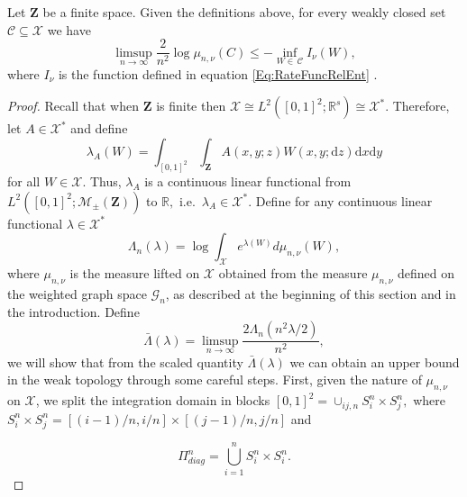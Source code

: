 \documentclass[12pt,twoside,a4paper]{article}
\newcommand{\Square}{{S^n_i\times S^n_j}}
\newcommand{\SquareDiag}{{\Pi^n_{diag}}}
\newcommand{\SquareDiagI}{{S^n_i\times S^n_i}}
\newcommand{\Space}{\mathbf{Z}}
\begin{document}
\begin{theorem}\label{thm:ldpupperboundweak}
Let $\Space$ be a finite space. Given the definitions above, for every weakly closed set $\mathcal{C}\subseteq\mathcal{X}$ we have
\begin{equation}
    \limsup_{n\to\infty} \frac{2}{n^2}\log \mu_{n,\nu}(C)\leq - \inf_{W\in \,\mathcal{C}} I_{\nu}(W),
\end{equation}
where $I_\nu$ is the function defined in equation \eqref{Eq:RateFuncRelEnt} .
\end{theorem}
\begin{proof}
Recall that when $\Space$ is finite then $\mathcal{X}\cong L^2([0,1]^2;\mathbb{R}^s)\cong\mathcal{X}^*$.
Therefore, let $A\in \mathcal{X}^*$ and define   
\[
\lambda_A( W)=\int_{[0,1]^2}\int_\Space A(x,y;z) W(x,y;\mathrm{d}z)\mathrm{d}x\mathrm{d}y
\]
for all $ W \in \mathcal{X}$. Thus, $\lambda_A$ is a continuous linear functional from $L^2([0,1]^2;\mathcal{M}_{\pm}(\Space))$ to $\mathbb{R},$ i.e.\ $\lambda_A\in \mathcal{X}^*.$ 
Define for any continuous linear functional $\lambda\in \mathcal{X}^*$ 
\[
\Lambda_n(\lambda)= \log \int_{\mathcal{X}} e^{\lambda( W)}d\mu_{n,\nu}( W),
\]
where $\mu_{n,\nu}$ is the measure lifted on $\mathcal{X}$ obtained from the measure $\mu_{n,\nu}$ defined on the weighted graph space $\mathcal{G}_n$, as described at the beginning of this section and in the introduction.  Define
\[
\bar{\Lambda}(\lambda)=\limsup_{n\to\infty}{\frac{2 \Lambda_n(n^2\lambda/2)}{n^2}},
\]
we will show that from the scaled quantity $\bar{\Lambda}(\lambda)$ we can obtain an upper bound in the weak topology through some careful steps.
First, given the nature of $\mu_{n,\nu}$ on $\mathcal{X}$, we split the integration domain in blocks $[0,1]^2=\cup_{ij,n} \Square,$ where $\Square=[(i-1)/n,i/n]\times[(j-1)/n,j/n]$ and 

\[
\SquareDiag = \bigcup_{i=1}^{n} \SquareDiagI.
\]


\end{proof}
\end{document}
